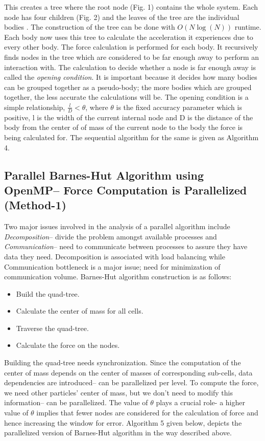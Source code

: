 \documentclass[letterpaper, 10 pt, conference]{ieeeconf}
\begin{document}
This creates a tree where the root node (Fig. 1) contains the whole system. Each node has four children (Fig. 2) and the leaves of the tree are the individual bodies \cite{c9}. The construction of the tree can be done with  \(O(N\log(N))\) runtime. Each body now uses this tree to calculate the acceleration it experiences due to every other body. The force calculation is performed for each body. It recursively finds nodes in the tree which are considered to be far enough away to perform an interaction with. The calculation to decide whether a node is far enough away is called the \textit{opening condition}. It is important because it decides how many bodies can be grouped together as a pseudo-body; the more bodies which are grouped together, the less accurate the calculations will be. The opening condition is a simple relationship, \(\frac{l}{D} < \theta\), where \(\theta\) is the fixed accuracy parameter which is positive, l is the width of the current internal node and D is the distance of the body from the center of of mass of the current node to the body the force is being calculated for. The sequential algorithm for the same is given as Algorithm 4.


\subsection{Parallel Barnes-Hut Algorithm using OpenMP{--} Force Computation is Parallelized (Method-1)}

Two major issues involved in the analysis of a parallel algorithm include \textit{Decomposition}{--} divide the problem amongst available processes and \textit{Communication}{--} need to communicate between processes to assure they have data they need. Decomposition is associated with load balancing while Communication bottleneck is a major issue; need for minimization of  communication volume. Barnes-Hut algorithm construction is as follows:

\begin{itemize}
\item Build the quad-tree.
\item Calculate the center of mass for all cells.
\item Traverse the quad-tree.
\item Calculate the force on the nodes.
\end{itemize}

Building the quad-tree needs synchronization. Since the computation of the center of mass depends on the center of masses of corresponding sub-cells, data dependencies are introduced{--} can be parallelized per level. To compute the force, we need other particles' center of mass, but we don't need to modify this information{--} can be parallelized. The value of $\theta$ plays a crucial role- a higher value of $\theta$ implies that fewer nodes are considered for the calculation of force and hence increasing the window for error. Algorithm 5 given below, depicts the parallelized version of Barnes-Hut algorithm in the way described above.
\end{document}
